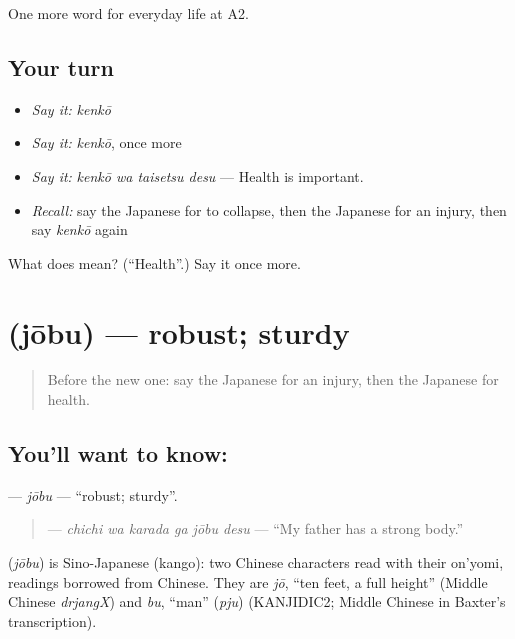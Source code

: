 \begin{grammarlens}[title={What you've built}]
One more word for everyday life at A2.
\end{grammarlens}

\subsection*{Your turn}
\begin{itemize}
\raggedright
  \item \emph{Say it:} \emph{kenkō}
  \item \emph{Say it:} \emph{kenkō}, once more
  \item \emph{Say it:} \emph{kenkō wa taisetsu desu} — Health is important.
  \item \emph{Recall:} say the Japanese for to collapse, then the Japanese for an injury, then say \emph{kenkō} again
\end{itemize}

\begin{tcolorbox}[breakable,colback=teal!4,colframe=teal!35!black,title={Before you move on}]
What does  mean? (\textquotedblleft{}Health\textquotedblright{}.) Say it once more.
\end{tcolorbox}
\section[\texorpdfstring{\ja{じょうぶ} (jōbu)}{じょうぶ (jōbu)}]{ (jōbu) — robust; sturdy}

\label{lesson:JA-C220-joubu}



\begin{quote}
Before the new one: say the Japanese for an injury, then the Japanese for health.
\end{quote}

\subsection*{You'll want to know: }
\textbf{} — \emph{jōbu} — \textquotedblleft{}robust; sturdy\textquotedblright{}.

\begin{quote}
\textbf{  } — \emph{chichi wa karada ga jōbu desu} — \textquotedblleft{}My father has a strong body.\textquotedblright{}
\end{quote}

\begin{cousinweb}
\textbf{} (\emph{jōbu}) is Sino-Japanese (kango): two Chinese characters read with their on'yomi, readings borrowed from Chinese. They are \emph{jō}, \textquotedblleft{}ten feet, a full height\textquotedblright{} (Middle Chinese \emph{drjangX}) and \emph{bu}, \textquotedblleft{}man\textquotedblright{} (\emph{pju}) (KANJIDIC2; Middle Chinese in Baxter's transcription).
\end{cousinweb}


